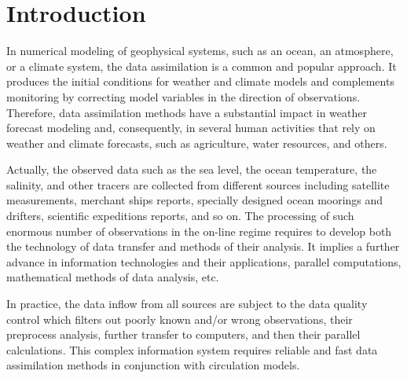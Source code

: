 

 \vspace*{6pt}


      \thispagestyle{headings}

      \begin{multicols}{2}

            \label{st\stat}
   


\section{Introduction}

\noindent
In numerical modeling of geophysical systems, such as an ocean, an atmosphere, or a
climate system, the data assimilation is a common and popular approach. It produces the initial 
conditions for weather and climate models and complements monitoring by correcting model 
variables in the direction of observations. Therefore, data assimilation methods have a 
substantial impact in  weather forecast modeling and, consequently, in 
several human activities that rely on weather and climate forecasts, such as agriculture, 
water resources, and others.

Actually, the observed data such as the sea level, the ocean temperature, the salinity, and other 
tracers are collected from different sources including satellite measurements, merchant ships
reports, 
specially designed ocean moorings and drifters, scientific expeditions reports,
and so on. The processing 
of such enormous number of observations in the on-line regime requires to develop both the 
technology of data transfer and methods of their analysis. It implies a further advance in 
information technologies and their applications, parallel computations, mathematical methods 
of data analysis, etc.

In practice, the data inflow from all sources are subject to the data quality control which 
filters out poorly known and/or wrong observations, their preprocess analysis, further 
transfer to computers, and then their parallel calculations. This complex information system 
requires reliable and fast data assimilation methods in conjunction with circulation 
models.


\end{multicols}
